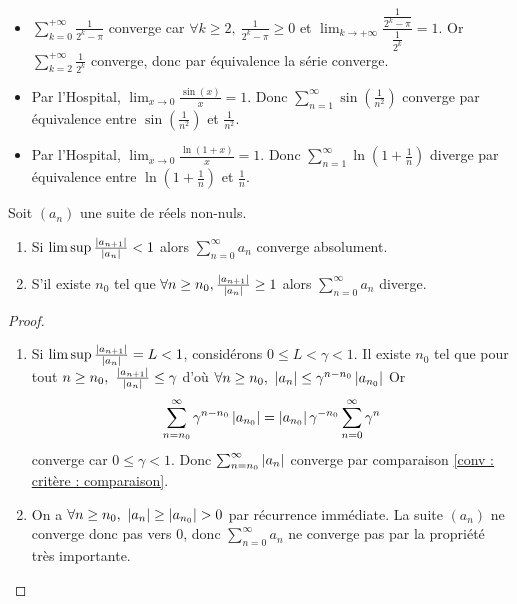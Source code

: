 \begin{exemple}
    \begin{itemize}
        \item $\sum_{k=0}^{+\infty}\frac{1}{2^k-\pi}$ converge car $\forall k\ge 2 ,\ \frac{1}{2^k-\pi}\ge 0$ et $\lim_{k\to+\infty}\dfrac{\frac1{2^k-\pi}}{\frac{1}{2^k}} = 1$. Or $\sum_{k=2}^{+\infty}\frac 1{2^k}$ converge, donc par équivalence la série converge.
        \item Par l'Hospital, $\lim_{x\to 0}\frac{\sin(x)}{x} = 1$. Donc $\sum_{n = 1}^\infty\sin\left(\frac{1}{n^2}\right)$ converge par équivalence entre $\sin\left(\frac{1}{n^2}\right)$ et $\frac{1}{n^2}$.
        \item Par l'Hospital, $\lim_{x\to 0}\frac{\ln(1+x)}{x} = 1$. Donc $\sum_{n = 1}^\infty\ln\left(1+\frac{1}{n}\right)$ diverge par équivalence entre $\ln\left(1+\frac{1}{n}\right)$ et $\frac{1}{n}$.
    \end{itemize}
\end{exemple}
\begin{proposition}
    Soit $(a_n)$ une suite de réels non-nuls.
    \begin{enumerate}
        \item Si $\limsup\frac{\left| a_{n+1} \right|}{\left| a_n \right|}<1$ alors $\sum_{n=0}^\infty a_n$ converge absolument.
        \item S'il existe $n_0$ tel que $\forall n\ge n_0, \frac{\left| a_{n+1} \right|}{\left| a_n \right|}\ge 1$ alors $\sum_{n = 0}^\infty a_n$ diverge.
    \end{enumerate}
\end{proposition}
\begin{proof}
    \begin{enumerate}
        \item Si $\limsup\frac{\left| a_{n+1} \right|}{\left| a_n \right|} = L<1$, considérons $0\le L<\gamma<1$. Il existe $n_0$ tel que pour tout $n\ge n_0,\ \frac{\abs{a_{n+1}}}{\abs{a_n}} \le \gamma$ d'où $\forall n\ge n_0,\ \left| a_n \right|\le \gamma^{n-n_0}\left| a_{n_0} \right|$ Or $$\sum_{n=n_0}^\infty\gamma^{n-n_0}\left| a_{n_0} \right| = \left| a_{n_0} \right|\gamma^{-n_0}\sum_{n=0}^\infty \gamma^n$$ converge car $0\le \gamma<1$. Donc $\sum_{n=n_0}^\infty\left| a_n \right|$ converge par comparaison \ref{conv : critère : comparaison}.
        \item On a $\forall n\ge n_0,\ \abs {a_n}\ge \abs{a_{n_0}}>0$ par récurrence immédiate. La suite $(a_n)$ ne converge donc pas vers $0$, donc $\sum_{n=0}^\infty a_n$ ne converge pas par la propriété très importante.
    \end{enumerate}
\end{proof}
